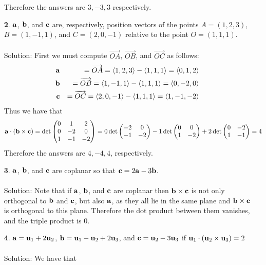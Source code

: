 \documentclass[12pt]{amsbook}
\newcommand{\la}{\langle}
\newcommand{\ra}{\rangle}
\begin{document}
\begin{enumerate}
Therefore the answers are $3,-3,3$ respectively.
\\
\item[{\small\bf 2}.] ${\bf a}$, ${\bf b}$, and ${\bf c}$
are, respectively, position vectors of the points
$A=(1,2,3)$, $B=(1,-1,1)$, and $C=(2,0,-1)$ relative to 
the point $O=(1,1,1)$. 
\\
\\
{\sc Solution}:
First we must compute $\overrightarrow{OA}$, $\overrightarrow{OB}$, and $\overrightarrow{OC}$ as follows:
\begin{eqnarray*}
{\bf a}&&=\overrightarrow{OA}=\la 1,2,3 \ra - \la 1,1,1 \ra = \la 0,1,2 \ra \\
{\bf b}&&=\overrightarrow{OB}=\la 1,-1,1 \ra - \la 1,1,1 \ra = \la 0,-2,0 \ra \\
{\bf c}&&=\overrightarrow{OC}=\la 2,0,-1 \ra - \la 1,1,1 \ra = \la 1,-1,-2 \ra 
\end{eqnarray*}
Thus we have that 
$${\bf a}\cdot({\bf b}\times{\bf c})=\det
\begin{pmatrix}
0 & 1 & 2\cr 0&-2&0\cr 1&-1&-2 \end{pmatrix}=0\det\begin{pmatrix}-2&0\cr -1&-2  \end{pmatrix}-1\det\begin{pmatrix}0&0\cr 1&-2  \end{pmatrix}+2\det\begin{pmatrix}0&-2\cr 1&-1 \end{pmatrix}=4 $$
Therefore the answers are $4,-4,4$, respectively. 
\item[{\small\bf 3}.] ${\bf a}$, ${\bf b}$, and ${\bf c}$ are coplanar
so that ${\bf c}=2{\bf a}-3{\bf b}$. \\
\\
{\sc Solution}:
Note that if $\bf a$, $\bf b$, and $\bf c$ are coplanar then ${\bf b}\times{\bf c}$ is not only orthogonal to ${\bf b}$ and ${\bf c}$, but also ${\bf a}$, as they all lie in the same plane and ${\bf b}\times{\bf c}$ is orthogonal to this plane. Therefore the dot product between them vanishes, and the triple product is $0$.
\\
\item[{\small\bf 4}.] ${\bf a}={\bf u}_1+2{\bf u}_2$,
${\bf b}={\bf u}_1-{\bf u}_2+2{\bf u}_3$, and 
${\bf c}={\bf u}_2-3{\bf u}_3$ if 
${\bf u}_1\cdot({\bf u}_2\times{\bf u}_3)=2$ \\
\\
{\sc Solution}: We have that 
\begin{eqnarray*}

\end{eqnarray*}
\end{enumerate}
\end{document}
